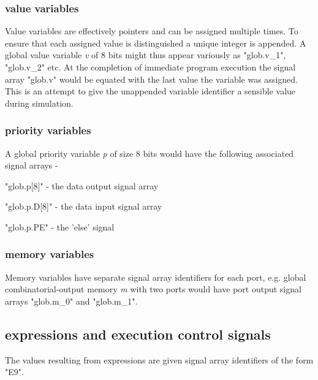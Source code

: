             \subsubsection{value variables}

                Value variables are effectively pointers and can be
                assigned multiple times. To ensure that each assigned
                value is distinguished a unique integer is appended.
                A global value variable {\em v} of 8 bits might thus appear
                variously as "glob.v\_1", "glob.v\_2" etc.                
                At the
                completion of immediate program execution the signal array
                "glob.v" would be equated with the last value the variable was
                assigned. This is an attempt to give the unappended variable
                identifier a sensible value during simulation.

            \subsubsection{priority variables}

                A global priority variable {\em p} of size 8 bits would have
                the following associated signal arrays -
                \blist
                \item   "glob.p[8]" - the data output signal array
                \item   "glob.p.D[8]" - the data input signal array
                \item   "glob.p.PE" - the 'else' signal
                \blend


            \subsubsection{memory variables}

                Memory variables have separate signal array identifiers
                for each port, e.g. global combinatorial-output memory
                {\em m} with two ports would have port output signal arrays
                "glob.m\_0" and "glob.m\_1".


        \subsection{expressions and execution control signals}

            The values resulting from expressions are given signal array
            identifiers of the form "E9".


